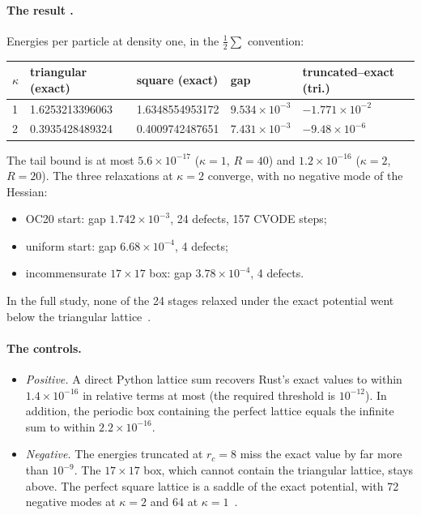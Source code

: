 \paragraph{The result \tierX.} Energies per particle at density one, in the $\tfrac12\sum$ convention:

\begin{center}\small
\begin{tabular}{lllll}\toprule
$\kappa$ & triangular (exact) & square (exact) & gap & truncated--exact (tri.)\\\midrule
1 & 1.6253213396063 & 1.6348554953172 & $9.534\times10^{-3}$ & $-1.771\times10^{-2}$\\
2 & 0.3935428489324 & 0.4009742487651 & $7.431\times10^{-3}$ & $-9.48\times10^{-6}$\\
\bottomrule\end{tabular}
\end{center}
The tail bound is at most $5.6\times10^{-17}$ ($\kappa=1$, $R=40$) and $1.2\times10^{-16}$ ($\kappa=2$,
$R=20$). The three relaxations at $\kappa=2$ converge, with no negative mode of the Hessian:
\begin{itemize}
\item OC20 start: gap $1.742\times10^{-3}$, 24 defects, 157 CVODE steps;
\item uniform start: gap $6.68\times10^{-4}$, 4 defects;
\item incommensurate $17\times17$ box: gap $3.78\times10^{-4}$, 4 defects.
\end{itemize}
In the full study, none of the 24 stages relaxed under the exact potential went below the triangular
lattice~\cite{ch2yuk}.

\paragraph{The controls.}
\begin{itemize}
\item \emph{Positive.} A direct Python lattice sum recovers Rust's exact values to within
$1.4\times10^{-16}$ in relative terms at most (the required threshold is $10^{-12}$). In addition, the periodic box containing the perfect lattice equals the infinite
sum to within $2.2\times10^{-16}$.
\item \emph{Negative.} The energies truncated at $r_c=8$ miss the exact value by far more than $10^{-9}$. The
$17\times17$ box, which cannot contain the triangular lattice, stays above. The perfect square lattice is a saddle
of the exact potential, with 72 negative modes at $\kappa=2$ and 64 at $\kappa=1$~\cite{ch2yuk}.
\end{itemize}

